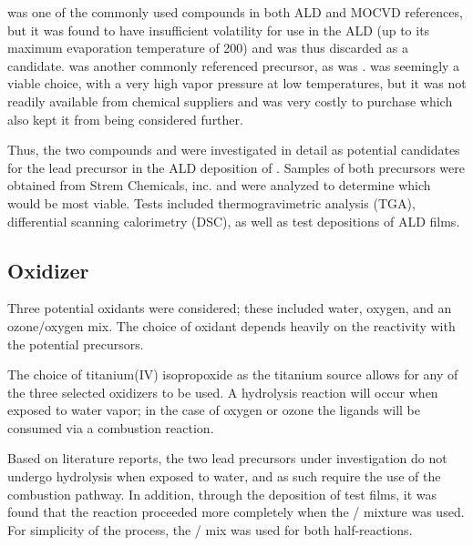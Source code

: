  was one of the commonly used compounds in both ALD and MOCVD references, but it was found to have insufficient volatility for use in the ALD (up to its maximum evaporation temperature of 200\degC{})\cite{harjuoja_2006} and was thus discarded as a candidate. \TMHD{} was another commonly referenced precursor\cite{watanabe_growth_2007}, as was \HFAc{}.\cite{Igumenov_1998}  was seemingly a viable choice, with a very high vapor pressure at low temperatures,\cite{Hwang_2007} but it was not readily available from chemical suppliers and was very costly to purchase which also kept it from being considered further. 

Thus, the two compounds \HFAc{} and \TMHD{} were investigated in detail as potential candidates for the lead precursor in the ALD deposition of \PTO{}. Samples of both precursors were obtained from Strem Chemicals, inc.\cite{strem_inc} and were analyzed to determine which would be most viable. Tests included thermogravimetric analysis (TGA), differential scanning calorimetry (DSC), as well as test depositions of ALD films. 


\subsection{Oxidizer}

Three potential oxidants were considered; these included water, oxygen, and an ozone/oxygen mix. The choice of oxidant depends heavily on the reactivity with the potential precursors. 

The choice of titanium(IV) isopropoxide as the titanium source allows for any of the three selected oxidizers to be used. A hydrolysis reaction will occur when exposed to water vapor; in the case of oxygen or ozone the ligands will be consumed via a combustion reaction.\cite{ALD-Handbook,Leskela_2002,lim_atomic_2003}

Based on literature reports, the two lead precursors under investigation do not undergo hydrolysis when exposed to water, and as such require the use of the combustion pathway. In addition, through the deposition of test films, it was found that the reaction proceeded more completely when the / mixture was used. For simplicity of the process, the / mix was used for both half-reactions.\cite{KeunKim2005103}


